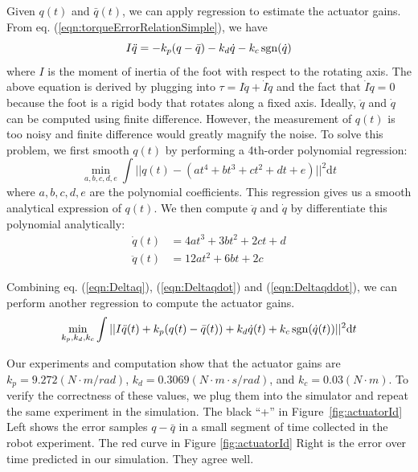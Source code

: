 Given $q(t)$ and $\bar{q}(t)$, we can apply regression to estimate the actuator gains. From eq. (\ref{eqn:torqueErrorRelationSimple}), we have
\begin{equation}
I\ddot{q}=-k_p(q-\bar{q}) - k_d\dot{q} - k_c\operatorname{sgn}(\dot{q})
\end{equation}
where $I$ is the moment of inertia of the foot with respect to the rotating axis. The above equation is derived by plugging into $\tau = I\ddot{q}+\dot{I}\dot{q}$ and the fact that $\dot{I}\dot{q}=0$ because the foot is a rigid body that rotates along a fixed axis. Ideally, $\ddot{q}$ and $\dot{q}$ can be computed using finite difference. However, the measurement of $q(t)$ is too noisy and finite difference would greatly magnify the noise. To solve this problem, we first smooth $q(t)$ by performing a 4th-order polynomial regression:
\begin{equation}
  \min_{a,b,c,d,e}\int ||q(t)-(at^4+bt^3+ct^2+dt+e)||^2\mathrm{d}t
  \label{eqn:Deltaq}
\end{equation}
where $a,b,c,d,e$ are the polynomial coefficients. This regression gives us a smooth analytical expression of $q(t)$. We then compute $\ddot{q}$ and $\dot{q}$ by differentiate this polynomial analytically:
\begin{align}
\label{eqn:Deltaqdot}  \dot{q}(t)&=4at^3+3bt^2+2ct+d\\
\label{eqn:Deltaqddot}  \ddot{q}(t)&=12at^2+6bt+2c
\end{align}

Combining eq. (\ref{eqn:Deltaq}), (\ref{eqn:Deltaqdot}) and (\ref{eqn:Deltaqddot}), we can perform another regression to compute the actuator gains.
\begin{equation}
\min_{k_p, k_d, k_c}\int||I\ddot{q}(t)+k_p(q(t)-\bar{q}(t)) + k_d\dot{q}(t) + k_c\operatorname{sgn}(\dot{q}(t))||^2\mathrm{d}t
\end{equation}

Our experiments and computation show that the actuator gains are $k_p=9.272(N\cdot m/rad)$, $k_d=0.3069(N\cdot m\cdot s/rad)$, and $k_c=0.03(N\cdot m)$. To verify the correctness of these values, we plug them into the simulator and repeat the same experiment in the simulation. The black ``+'' in Figure~\ref{fig:actuatorId} Left shows the error samples $q-\bar{q}$ in a small segment of time collected in the robot experiment. The red curve in Figure \ref{fig:actuatorId} Right is the error over time predicted in our simulation. They agree well.


